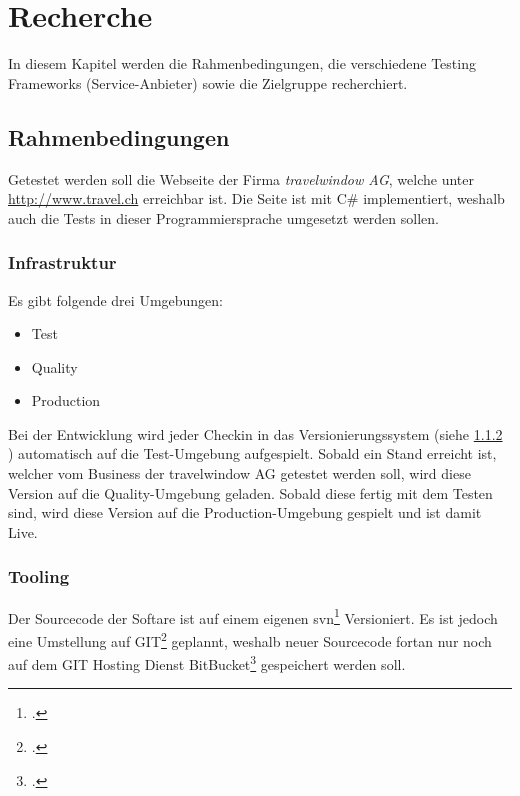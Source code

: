 \chapter{Recherche}

In diesem Kapitel werden die Rahmenbedingungen, die verschiedene Testing Frameworks (Service-Anbieter) sowie die Zielgruppe recherchiert.

\section{Rahmenbedingungen}
\label{sec:Recherche:Rahmenbedingungen}
Getestet werden soll die Webseite der Firma \textit{travelwindow AG}, welche unter \url{http://www.travel.ch} erreichbar ist. Die Seite ist mit C\# implementiert, weshalb auch die Tests in dieser Programmiersprache umgesetzt werden sollen.

\subsection{Infrastruktur}
\label{sec:Recherche:Rahmenbedingungen:Infrastruktur}
Es gibt folgende drei Umgebungen:
\begin{itemize}
\item Test
\item Quality
\item Production
\end{itemize}
Bei der Entwicklung wird jeder Checkin in das Versionierungssystem (siehe \cref{sec:Recherche:Rahmenbedingungen:Tooling} ) automatisch auf die Test-Umgebung aufgespielt. Sobald ein Stand erreicht ist, welcher vom Business der travelwindow AG getestet werden soll, wird diese Version auf die Quality-Umgebung geladen. Sobald diese fertig mit dem Testen sind, wird diese Version auf die Production-Umgebung gespielt und ist damit Live.

\subsection{Tooling}
\label{sec:Recherche:Rahmenbedingungen:Tooling}
Der Sourcecode der Softare ist auf einem eigenen \gls{svn}\footcite{Apache_Subversion_2015-07-26} Versioniert. Es ist jedoch eine Umstellung auf GIT\footcite{Git_2015-07-26} geplannt, weshalb neuer Sourcecode fortan nur noch auf dem GIT Hosting Dienst BitBucket\footcite{Git_and_Mercurial_code_management_for_teams_2015-07-26} gespeichert werden soll.

